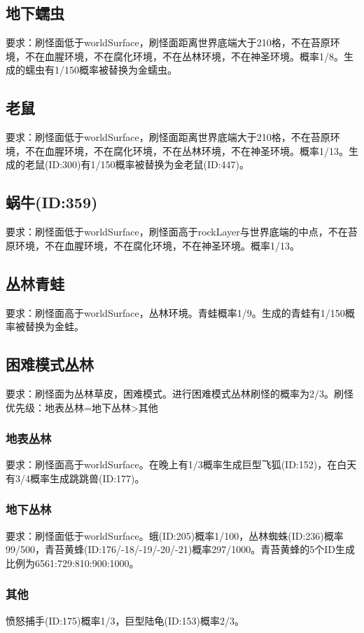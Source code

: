 \subsection{地下蠕虫}
要求：刷怪面低于worldSurface，刷怪面距离世界底端大于210格，不在苔原环境，不在血腥环境，不在腐化环境，不在丛林环境，不在神圣环境。概率1/8。生成的蠕虫有1/150概率被替换为金蠕虫。

\subsection{老鼠}
要求：刷怪面低于worldSurface，刷怪面距离世界底端大于210格，不在苔原环境，不在血腥环境，不在腐化环境，不在丛林环境，不在神圣环境。概率1/13。生成的老鼠(ID:300)有1/150概率被替换为金老鼠(ID:447)。

\subsection{蜗牛(ID:359)}
要求：刷怪面低于worldSurface，刷怪面高于rockLayer与世界底端的中点，不在苔原环境，不在血腥环境，不在腐化环境，不在神圣环境。概率1/13。

\subsection{丛林青蛙}
要求：刷怪面高于worldSurface，丛林环境。青蛙概率1/9。生成的青蛙有1/150概率被替换为金蛙。

\subsection{困难模式丛林}
要求：刷怪面为丛林草皮，困难模式。进行困难模式丛林刷怪的概率为2/3。刷怪优先级：地表丛林=地下丛林>其他

\subsubsection{地表丛林}
要求：刷怪面高于worldSurface。在晚上有1/3概率生成巨型飞狐(ID:152)，在白天有3/4概率生成跳跳兽(ID:177)。

\subsubsection{地下丛林}
要求：刷怪面低于worldSurface。蛾(ID:205)概率1/100，丛林蜘蛛(ID:236)概率99/500，青苔黄蜂(ID:176/-18/-19/-20/-21)概率297/1000。青苔黄蜂的5个ID生成比例为6561:729:810:900:1000。

\subsubsection{其他}
愤怒捕手(ID:175)概率1/3，巨型陆龟(ID:153)概率2/3。

